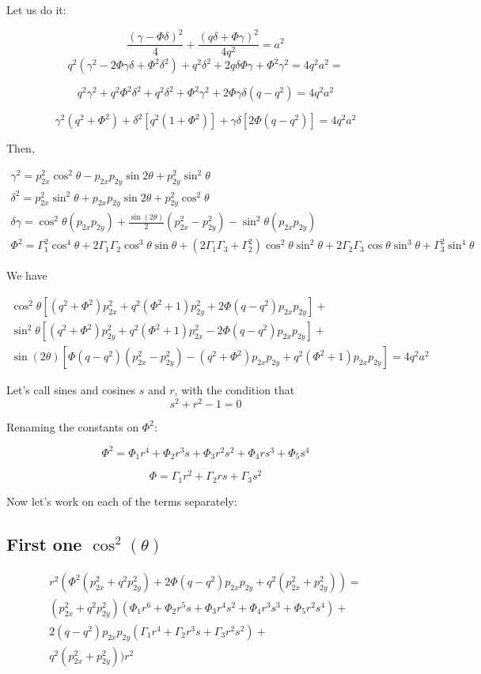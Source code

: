 \documentclass{article}
\begin{document}
Let us do it:


$$ \frac{(\gamma - \Phi\delta)^2}{4} + \frac{(q\delta + \Phi\gamma)^2}{4q^2} = a^2$$
$$ q^2(\gamma^2 - 2\Phi\gamma\delta + \Phi^2\delta^2) + q^2\delta^2 + 2q\delta \Phi \gamma + \Phi^2\gamma^2 = 4q^2a^2= $$

$$
q^2\gamma^2 + q^2\Phi^2\delta^2 + q^2\delta^2 +\Phi^2\gamma^2  + 2\Phi\gamma\delta(q - q^2)= 4q^2a^2
$$

$$
\gamma^2(q^2 +\Phi^2) + \delta^2[q^2(1+\Phi^2)] + \gamma\delta[2\Phi(q-q^2)]= 4q^2a^2
$$

Then,
\newcommand{\ct}{\cos{\theta}}
\newcommand{\ctt}[1]{\cos^{#1}{\theta}}
\newcommand{\st}{\sin{\theta}}
\newcommand{\stt}[1]{\sin^{#1}{\theta}}


\begin{eqnarray}
\gamma^2 = p_{2x}^2\cos^2{\theta} - p_{2x}p_{2y}\sin{2\theta} + p_{2y}^2\sin^2{\theta}\\
\delta^2 = p_{2x}^2\sin^2{\theta} + p_{2x}p_{2y}\sin{2\theta}+ p_{2y}^2\cos^2{\theta}\\
\delta\gamma = \cos^2{\theta}(p_{2x}p_{2y}) + \frac{\sin{(2\theta)}}{2}(p_{2x}^2 - p_{2y}^2) - \sin^2{\theta}(p_{2x}p_{2y})\\
\Phi^2=\Gamma_1^2\ctt{4} + 2\Gamma_1\Gamma_2\ctt{3}\st + (2\Gamma_1\Gamma_3 + \Gamma_2^2)\ctt{2}\stt{2} + 2\Gamma_2\Gamma_3\ct\stt{3} + \Gamma_3^2\stt{4}
\end{eqnarray}

We have

\begin{eqnarray*}
\cos^2{\theta}[(q^2+\Phi^2)p_{2x}^2 + q^2(\Phi^2+1)p_{2y}^2 + 2\Phi(q-q^2)p_{2x}p_{2y}]+\\
\sin^2{\theta}[(q^2+\Phi^2)p_{2y}^2 + q^2(\Phi^2+1)p_{2x}^2 - 2\Phi(q-q^2)p_{2x}p_{2y}]+\\
\sin{(2\theta)}[\Phi(q-q^2)(p_{2x}^2-p_{2y}^2) - (q^2+\Phi^2)p_{2x}p_{2y} + q^2(\Phi^2+1)p_{2x}p_{2y}]=4q^2a^2
\end{eqnarray*}



Let's call sines and cosines $s$ and $r$, with the condition that $$s^2+r^2-1=0$$

Renaming the constants on $\Phi^2$:

$$\Phi^2 = \Phi_1 r^4 + \Phi_2 r^3s + \Phi_3r^2s^2 + \Phi_4rs^3 + \Phi_5s^4$$

$$\Phi=\Gamma_1r^2 + \Gamma_2rs + \Gamma_3s^2$$

Now let's work on each of the terms separately:
\subsection{First one $\cos^2(\theta)$}
\begin{align*}
r^2(\Phi^2(p_{2x}^2 + q^2p_{2y}^2) + 2\Phi(q-q^2)p_{2x}p_{2y} + q^2(p_{2x}^2+p_{2y}^2))=\\
(p_{2x}^2+q^2p_{2y}^2)(\Phi_1 r^6 + \Phi_2 r^5s + \Phi_3r^4s^2 + \Phi_4r^3s^3 + \Phi_5r^2s^4) +\\
2(q-q^2)p_{2x}p_{2y}(\Gamma_1r^4 + \Gamma_2r^3s + \Gamma_3r^2s^2)+\\
q^2(p_{2x}^2+p_{2y}^2))r^2
\end{align*}
\end{document}
